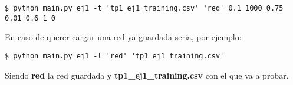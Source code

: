 \begin{verbatim}
$ python main.py ej1 -t 'tp1_ej1_training.csv' 'red' 0.1 1000 0.75  0.01 0.6 1 0 
\end{verbatim}

En caso de querer cargar una red ya guardada seria, por ejemplo:

\begin{verbatim}
$ python main.py ej1 -l 'red' 'tp1_ej1_training.csv'
\end{verbatim}

Siendo \textbf{red} la red guardada y \textbf{tp1\_ej1\_training.csv} con el que va a probar.